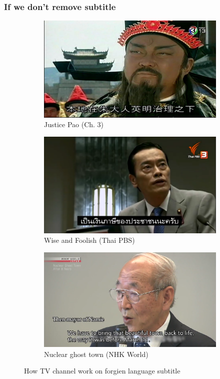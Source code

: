 \documentclass[xcolor=dvipsnames, xetex,serif]{beamer}
\newcommand{\backupend}{
   \setcounter{framenumber}{\value{finalframe}}
}
\begin{document}
    \begin{frame}
        \frametitle{If we don't remove subtitle}
        \begin{figure}[H]
            \centering
            \begin{subfigure}{0.45\linewidth}
                \centering
                \includegraphics[width=0.90\linewidth]{images/q_and_a/paopunjin.jpg}
                \caption{Justice Pao (Ch. 3)}
            \end{subfigure}
            \begin{subfigure}{0.45\linewidth}
                \centering
                \includegraphics[width=0.90\linewidth]{images/q_and_a/sample_of_subtitle_replace.png}
                \caption{Wise and Foolish (Thai PBS)}
            \end{subfigure}
            \begin{subfigure}{0.45\linewidth}
                \centering
                \includegraphics[width=0.90\linewidth]{images/q_and_a/nhk_subtitle.png}
                \caption{Nuclear ghost town (NHK World)}
            \end{subfigure}
            \caption{How TV channel work on forgien language subtitle}
        \end{figure}
    \end{frame}
    \backupend
\end{document}
